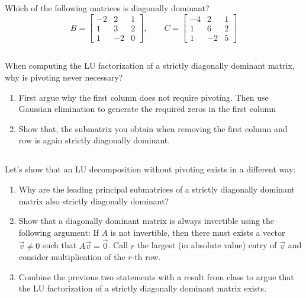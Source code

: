 \documentclass[11pt,letterpaper]{report}
\begin{document}
\subsection{}
Which of the following matrices is diagonally dominant?
$$
 B={\begin{bmatrix}-2&2&1\\1&3&2\\1&-2&0\end{bmatrix}}, \qquad
 C={\begin{bmatrix}-4&2&1\\1&6&2\\1&-2&5\end{bmatrix}}
$$

\subsection{}
When computing the LU
 factorization of a strictly diagonally dominant matrix, why is
 pivoting never necessary? 

\begin{enumerate}
    \item First argue why the first column does not require pivoting. Then use Gaussian elimination to generate the required zeros in the first column
    \item Show that, the submatrix you obtain when removing the first column and row is again strictly  diagonally dominant.
\end{enumerate}

\subsection{}
Let's show that an LU decomposition without pivoting exists in a different way:
  \begin{enumerate}
    \item Why are the leading principal submatrices of a strictly
      diagonally dominant matrix also strictly diagonally dominant?
    \item Show that a diagonally dominant matrix is always invertible
      using the following argument: If $A$ is not invertible, then
      there must exists a vector $\vec v\not=0$ such that
      $A\vec v = \vec 0$. Call $r$ the largest (in
      absolute value) entry of $\vec v$ and consider
      multiplication of the $r$-th row. 
    \item Combine the previous two statements with a result from class
      to argue that the LU factorization of a strictly diagonally
      dominant matrix exists.
 \end{enumerate}
 
\end{document}
